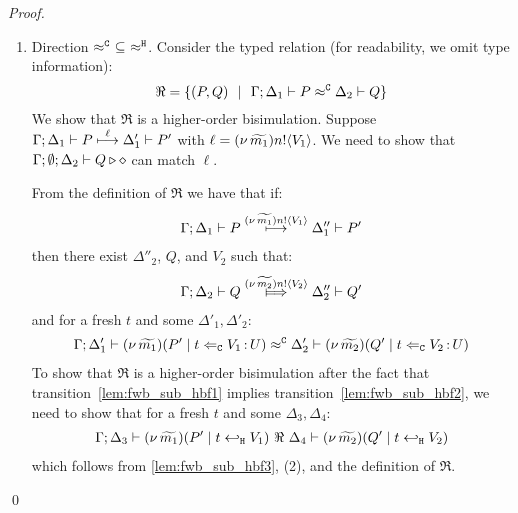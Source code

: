 \begin{proof}
\begin{enumerate}[1.]

		\item	Direction $\approx^\mathtt{C}\ \subseteq\ \approx^\mathtt{H}$.
				\noi Consider the typed relation (for readability, we omit type information):
				\[
					\Re = \{
								(P, Q) 
								\ \ |\ \ 
								\Gamma; \Delta_1 \vdash P \approx^\mathtt{C} \Delta_2 \vdash Q\}
				\]
				We show that $\Re$ is a higher-order bisimulation.
				Suppose
				$
						\Gamma; \Delta_1 \vdash P \stackrel{ \ell}{\longmapsto} \Delta_1' \vdash P'
				$ with 
				$\ell = (\nu\, \widetilde{m_1}) n ! \langle V_1 \rangle$.
				We need to show that $\Gamma; \emptyset; \Delta_2 \vdash Q \triangleright \diamond$
				can match $\ell$.
				

							\noi From the definition of $\Re$ we have that if:
							\begin{eqnarray}
								\Gamma; \Delta_1 \vdash P \stackrel{(\nu\, \widetilde{m_1}) n ! \langle V_1 \rangle}{\longmapsto} \Delta_1'' \vdash P'
								\label{lem:fwb_sub_hbf1}
							\end{eqnarray}
							then there exist $\Delta''_2$, $Q$, and $V_2$ such that:
							\begin{eqnarray}
								\horel{\Gamma}{\Delta_2}{Q}{\Hby{\news{\widetilde{m_2}} \bactout{n}{V_2}}}{\Delta_2''}{Q'}
								\label{lem:fwb_sub_hbf2}
							\end{eqnarray}
							and for a fresh $t$ and some $\Delta'_1, \Delta'_2$:
							\begin{eqnarray}
								\Gamma; \Delta_1' \vdash (\nu\, \widetilde{m_1})(P' \;|\; t \Leftarrow_{\mathtt{C}} V_1{\,:\,}U) \approx^\mathtt{C} \Delta_2' \vdash (\nu\, \widetilde{m_2})(Q' \;|\; t \Leftarrow_{\mathtt{C}} V_2{\,:\,}U )
								\label{lem:fwb_sub_hbf3}
							\end{eqnarray}
							\noi 
							To show that $\Re$ is a higher-order bisimulation
							after the fact that transition~\eqref{lem:fwb_sub_hbf1} implies transition~\eqref{lem:fwb_sub_hbf2},
							we need to show that for a fresh $t$ and some $\Delta_3, \Delta_4$:
							\begin{eqnarray}
								\Gamma; \Delta_3 \vdash (\nu\, \widetilde{m_1})(P' \;|\; t \hookleftarrow_{\mathtt{H}} V_1) \ \Re\  \Delta_4 \vdash (\nu\, \widetilde{m_2})(Q' \;|\; t \hookleftarrow_{\mathtt{H}} V_2)
								\label{lem:fwb_sub_hbf4}
							\end{eqnarray}
							which follows from \eqref{lem:fwb_sub_hbf3}, (2),
							and the definition of $\Re$.

	\end{enumerate}
	\qed
\end{proof}


